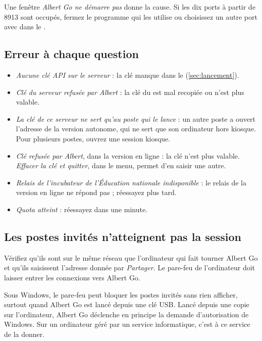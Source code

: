 \documentclass[a4paper, 11pt]{article}
\begin{document}
Une fenêtre \emph{Albert Go ne démarre pas} donne la cause. Si les dix ports à partir de 8913 sont occupés, fermez le programme qui les utilise ou choisissez un autre port avec  dans le .

\subsection*{Erreur à chaque question}

\begin{itemize}
  \item \emph{Aucune clé API sur le serveur} : la clé manque dans le  (\autoref{sec:lancement}).
  \item \emph{Clé du serveur refusée par Albert} : la clé du  est mal recopiée ou n'est plus valable.
  \item \emph{La clé de ce serveur ne sert qu'au poste qui le lance} : un autre poste a ouvert l'adresse de la version autonome, qui ne sert que son ordinateur hors kiosque. Pour plusieurs postes, ouvrez une session kiosque.
  \item \emph{Clé refusée par Albert}, dans la version en ligne : la clé n'est plus valable. \emph{Effacer la clé et quitter}, dans le menu, permet d'en saisir une autre.
  \item \emph{Relais de l'incubateur de l'Éducation nationale indisponible} : le relais de la version en ligne ne répond pas ; réessayez plus tard.
  \item \emph{Quota atteint} : réessayez dans une minute.
\end{itemize}

\subsection*{Les postes invités n'atteignent pas la session}

Vérifiez qu'ils sont sur le même réseau que l'ordinateur qui fait tourner Albert Go et qu'ils saisissent l'adresse donnée par \emph{Partager}. Le pare-feu de l'ordinateur doit laisser entrer les connexions vers Albert Go.

Sous Windows, le pare-feu peut bloquer les postes invités sans rien afficher, surtout quand Albert Go est lancé depuis une clé USB. Lancé depuis une copie sur l'ordinateur, Albert Go déclenche en principe la demande d'autorisation de Windows. Sur un ordinateur géré par un service informatique, c'est à ce service de la donner.
\end{document}
